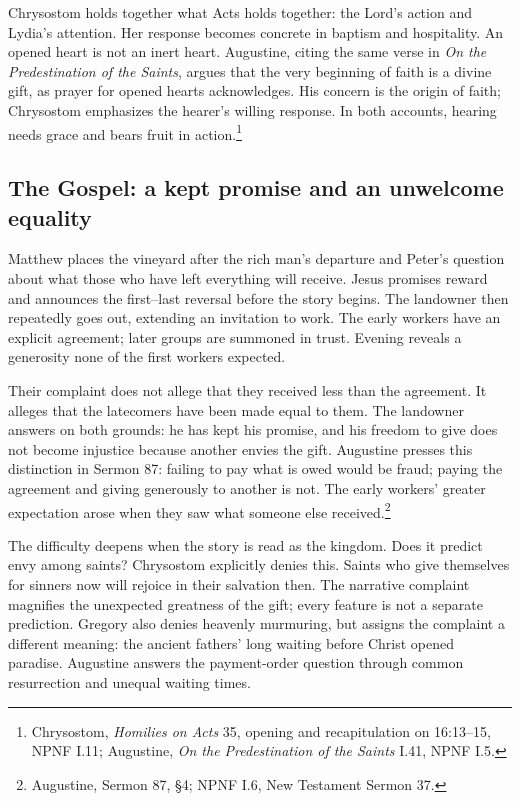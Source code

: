 Chrysostom holds together what Acts holds together: the Lord's action and Lydia's attention. Her response becomes concrete in baptism and hospitality. An opened heart is not an inert heart. Augustine, citing the same verse in \textit{On the Predestination of the Saints}, argues that the very beginning of faith is a divine gift, as prayer for opened hearts acknowledges. His concern is the origin of faith; Chrysostom emphasizes the hearer's willing response. In both accounts, hearing needs grace and bears fruit in action.\footnote{Chrysostom, \textit{Homilies on Acts} 35, opening and recapitulation on 16:13--15, NPNF I.11; Augustine, \textit{On the Predestination of the Saints} I.41, NPNF I.5.}

\subsection{The Gospel: a kept promise and an unwelcome equality}
Matthew places the vineyard after the rich man's departure and Peter's question about what those who have left everything will receive. Jesus promises reward and announces the first--last reversal before the story begins. The landowner then repeatedly goes out, extending an invitation to work. The early workers have an explicit agreement; later groups are summoned in trust. Evening reveals a generosity none of the first workers expected.

Their complaint does not allege that they received less than the agreement. It alleges that the latecomers have been made equal to them. The landowner answers on both grounds: he has kept his promise, and his freedom to give does not become injustice because another envies the gift. Augustine presses this distinction in Sermon 87: failing to pay what is owed would be fraud; paying the agreement and giving generously to another is not. The early workers' greater expectation arose when they saw what someone else received.\footnote{Augustine, Sermon 87, §4; NPNF I.6, New Testament Sermon 37.}

The difficulty deepens when the story is read as the kingdom. Does it predict envy among saints? Chrysostom explicitly denies this. Saints who give themselves for sinners now will rejoice in their salvation then. The narrative complaint magnifies the unexpected greatness of the gift; every feature is not a separate prediction. Gregory also denies heavenly murmuring, but assigns the complaint a different meaning: the ancient fathers' long waiting before Christ opened paradise. Augustine answers the payment-order question through common resurrection and unequal waiting times.

